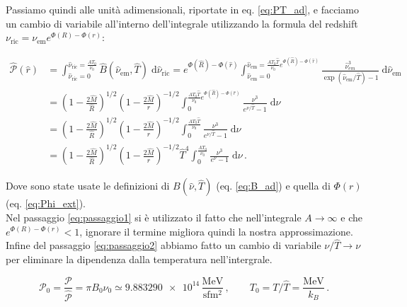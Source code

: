 \documentclass[a4paper, titlepage]{article}
\begin{document}
Passiamo quindi alle unità adimensionali, riportate in eq. \ref{eq:PT_ad}, e
facciamo un cambio di variabile all'interno dell'integrale utilizzando la
formula del redshift $\nu_\text{ric} = \nu_\text{em} e^{\Phi(R) - \Phi(r)}$:

\begin{subequations}
\begin{align}
    \hat{\mathcal P}(\hat r)
    &= \int_{\hat \nu_\text{ric} = 0}^{\hat \nu_\text{ric} = \frac{A T_0}{\nu_0}}
    \hat B (\hat \nu_\text{em}, \hat T) \; \mathrm{d} \hat \nu_\text{ric}
    = e^{\Phi(\hat R) - \Phi(\hat r)}
    \int_{\hat \nu_\text{em} = 0}^{\hat \nu_\text{em} = \frac{A T_0 \hat T}{\nu_0} e^{\Phi(\hat R) - \Phi(\hat r)}}
    \frac{\hat \nu_{em}^3}{\exp(\hat \nu_\text{em} / \hat T) - 1} \; \mathrm{d}\hat \nu_\text{em} \\
    &= \left(1 - \frac{2 \hat M}{\hat R} \right)^{1/2}
    \left(1 - \frac{2 \hat M}{\hat r} \right)^{-1/2}
    \int_0^{\frac{A T_0 \hat T}{\nu_0} e^{\Phi(\hat R) - \Phi(\hat r)}}
    \frac{\nu^3}{e^{\nu / \hat T} - 1} \; \mathrm{d} \nu \\
    &= \left(1 - \frac{2 \hat M}{\hat R} \right)^{1/2}
    \left(1 - \frac{2 \hat M}{\hat r} \right)^{-1/2}
    \int_0^{\frac{A T_0 \hat T}{\nu_0}} \frac{\nu^3}{e^{\nu / \hat T} - 1} \;
    \mathrm{d} \nu \label{eq:passaggio1} \\
    &= \left(1 - \frac{2 \hat M}{\hat R} \right)^{1/2}
    \left(1 - \frac{2 \hat M}{\hat r} \right)^{-1/2} \hat T^4
    \int_0^{\frac{A T_0}{\nu_0}} \frac{\nu^3}{e^{\nu} - 1} \;
    \mathrm{d} \nu \, . \label{eq:passaggio2}
\end{align}
\label{eq:Pot_ad}
\end{subequations}

Dove sono state usate le definizioni di $B(\hat \nu, \hat T)$ (eq.
\ref{eq:B_ad}) e quella di $\Phi (r)$ (eq. \ref{eq:Phi_ext}). \\
Nel passaggio \ref{eq:passaggio1} si è utilizzato il fatto che nell'integrale
$A \to \infty$ e che $e^{\Phi(R) - \Phi(r)} < 1$, ignorare il termine migliora
quindi la nostra approssimazione. \\
Infine del passaggio \ref{eq:passaggio2} abbiamo fatto un cambio di variabile
$\nu / \hat T \rightarrow \nu$ per eliminare la dipendenza dalla temperatura
nell'intergrale.

\begin{equation}
    \mathcal P_0 = \frac{\mathcal P}{\hat {\mathcal P}}
    = \pi B_0 \nu_0 \simeq \num{9.883290e+14} \,
    \frac{\unit{\mega\electronvolt}}{\unit{\second\femto\meter\squared}} \, ,
    \quad \quad
    T_0 = T / \hat T = \frac{\unit{\mega\electronvolt}}{k_B} \, .
    \label{eq:PT_ad}
\end{equation}
\end{document}
